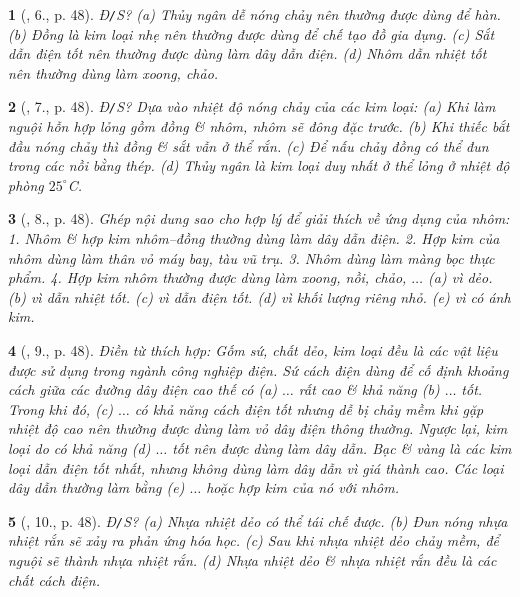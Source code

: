 \documentclass{article}
\newtheorem{baitoan}{}
\begin{document}
\begin{baitoan}[\cite{ncpt_KHTN_6_tap_1}, 6., p. 48]
	{\rm Đ{\tt/}S?} (a) Thủy ngân dễ nóng chảy nên thường được dùng để hàn. (b) Đồng là kim loại nhẹ nên thường được dùng để chế tạo đồ gia dụng. (c) Sắt dẫn điện tốt nên thường được dùng làm dây dẫn điện. (d) Nhôm dẫn nhiệt tốt nên thường dùng làm xoong, chảo.
\end{baitoan}

\begin{baitoan}[\cite{ncpt_KHTN_6_tap_1}, 7., p. 48]
	{\rm Đ{\tt/}S?} Dựa vào nhiệt độ nóng chảy của các kim loại: (a) Khi làm nguội hỗn hợp lỏng gồm đồng \& nhôm, nhôm sẽ đông đặc trước. (b) Khi thiếc bắt đầu nóng chảy thì đồng \& sắt vẫn ở thể rắn. (c) Để nấu chảy đồng có thể đun trong các nồi bằng thép. (d) Thủy ngân là kim loại duy nhất ở thể lỏng ở nhiệt độ phòng $25^\circ${\rm C}.
\end{baitoan}

\begin{baitoan}[\cite{ncpt_KHTN_6_tap_1}, 8., p. 48]
	Ghép nội dung sao cho hợp lý để giải thích về ứng dụng của nhôm: 1. Nhôm \& hợp kim nhôm--đồng thường dùng làm dây dẫn điện. 2. Hợp kim của nhôm dùng làm thân vỏ máy bay, tàu vũ trụ. 3. Nhôm dùng làm màng bọc thực phẩm. 4. Hợp kim nhôm thường được dùng làm xoong, nồi, chảo, $\ldots$ (a) vì dẻo. (b) vì dẫn nhiệt tốt. (c) vì dẫn điện tốt. (d) vì khối lượng riêng nhỏ. (e) vì có ánh kim.
\end{baitoan}

\begin{baitoan}[\cite{ncpt_KHTN_6_tap_1}, 9., p. 48]
	Điền từ thích hợp: Gốm sứ, chất dẻo, kim loại đều là các vật liệu được sử dụng trong ngành công nghiệp điện. Sứ cách điện dùng để cố định khoảng cách giữa các đường dây điện cao thế có (a) $\ldots$ rất cao \& khả năng (b) $\ldots$ tốt. Trong khi đó, (c) $\ldots$ có khả năng cách điện tốt nhưng dễ bị chảy mềm khi gặp nhiệt độ cao nên thường được dùng làm vỏ dây điện thông thường. Ngược lại, kim loại do có khả năng (d) $\ldots$ tốt nên được dùng làm dây dẫn. Bạc \& vàng là các kim loại dẫn điện tốt nhất, nhưng không dùng làm dây dẫn vì giá thành cao. Các loại dây dẫn thường làm bằng (e) $\ldots$ hoặc hợp kim của nó với nhôm.
\end{baitoan}

\begin{baitoan}[\cite{ncpt_KHTN_6_tap_1}, 10., p. 48]
	{\rm Đ{\tt/}S?} (a) Nhựa nhiệt dẻo có thể tái chế được. (b) Đun nóng nhựa nhiệt rắn sẽ xảy ra phản ứng hóa học. (c) Sau khi nhựa nhiệt dẻo chảy mềm, để nguội sẽ thành nhựa nhiệt rắn. (d) Nhựa nhiệt dẻo \& nhựa nhiệt rắn đều là các chất cách điện.
\end{baitoan}
\end{document}

